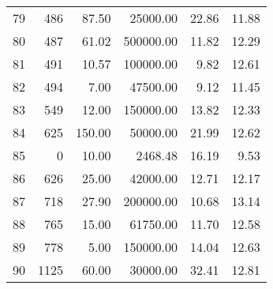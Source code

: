 \begin{tabular}{rrrrrr}
    79 &    486 &  87.50 &  25000.00 &  22.86 & 11.88 \\
    80 &    487 &  61.02 & 500000.00 &  11.82 & 12.29 \\
    81 &    491 &  10.57 & 100000.00 &   9.82 & 12.61 \\
    82 &    494 &   7.00 &  47500.00 &   9.12 & 11.45 \\
    83 &    549 &  12.00 & 150000.00 &  13.82 & 12.33 \\
    84 &    625 & 150.00 &  50000.00 &  21.99 & 12.62 \\
    85 &      0 &  10.00 &   2468.48 &  16.19 &  9.53 \\
    86 &    626 &  25.00 &  42000.00 &  12.71 & 12.17 \\
    87 &    718 &  27.90 & 200000.00 &  10.68 & 13.14 \\
    88 &    765 &  15.00 &  61750.00 &  11.70 & 12.58 \\
    89 &    778 &   5.00 & 150000.00 &  14.04 & 12.63 \\
    90 &   1125 &  60.00 &  30000.00 &  32.41 & 12.81 \\
\bottomrule
\end{tabular}
